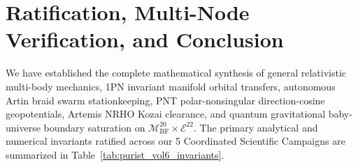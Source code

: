 \documentclass[11pt,a4paper,reqno]{article}
\theoremstyle{plain}
\theoremstyle{definition}
\theoremstyle{remark}
\numberwithin{equation}{section}
\newcommand{\MbfTwenty}{\mathcal{M}_{\mathrm{BF}}^{20}}
\newcommand{\Ebundle}{\mathcal{E}^{22}}
\begin{document}
\section{Ratification, Multi-Node Verification, and Conclusion}
\label{sec:conclusion}

We have established the complete mathematical synthesis of general relativistic multi-body mechanics, 1PN invariant manifold orbital transfers, autonomous Artin braid swarm stationkeeping, PNT polar-nonsingular direction-cosine geopotentials, Artemis NRHO Kozai clearance, and quantum gravitational baby-universe boundary saturation on $\MbfTwenty \times \Ebundle$. The primary analytical and numerical invariants ratified across our 5 Coordinated Scientific Campaigns are summarized in Table~\ref{tab:purist_vol6_invariants}.
\end{document}
